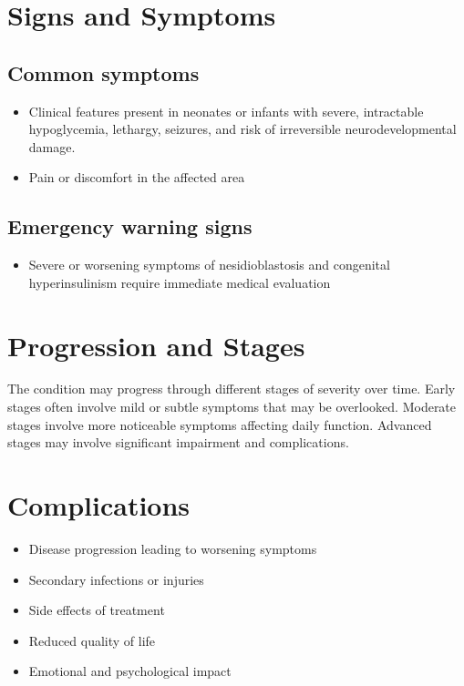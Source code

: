 \section{Signs and Symptoms}

\subsection{Common symptoms}
\begin{itemize}[noitemsep]
  \item Clinical features present in neonates or infants with severe, intractable hypoglycemia, lethargy, seizures, and risk of irreversible neurodevelopmental damage.

  \item Pain or discomfort in the affected area
  \end{itemize}

\subsection{Emergency warning signs}
\begin{itemize}[noitemsep]
  \item Severe or worsening symptoms of nesidioblastosis and congenital hyperinsulinism require immediate medical evaluation
\end{itemize}
\section{Progression and Stages}
The condition may progress through different stages of severity over time. Early stages often involve mild or subtle symptoms that may be overlooked. Moderate stages involve more noticeable symptoms affecting daily function. Advanced stages may involve significant impairment and complications.
\section{Complications}
\begin{itemize}[noitemsep]
  \item Disease progression leading to worsening symptoms
  \item Secondary infections or injuries
  \item Side effects of treatment
  \item Reduced quality of life
  \item Emotional and psychological impact
\end{itemize}

